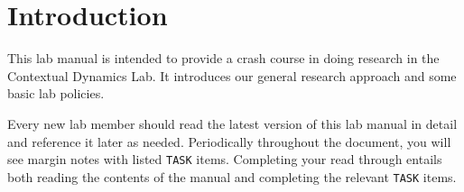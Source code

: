 \documentclass{tufte-book} %
\begin{document}






\newcommand{\director}{Jeremy}
\newcommand{\coordinator}{Kirsten}

\cleardoublepage
\chapter{Introduction}\label{ch:intro} %
This lab manual is intended to provide a crash course in doing
research in the Contextual Dynamics Lab.  It introduces our general research
approach and some basic lab policies.

  
Every new lab member should read
the latest version of this lab manual in detail and reference it later
as needed.  Periodically throughout the document, you will see margin
notes with listed \texttt{TASK} items.  Completing your read through
entails both reading the contents of the manual and completing the
relevant \texttt{TASK} items.
\end{document}
